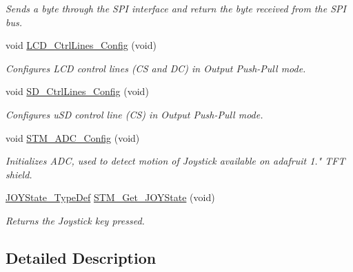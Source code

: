 \begin{DoxyCompactItemize}
\begin{DoxyCompactList}\small\item\em Sends a byte through the S\+PI interface and return the byte received from the S\+PI bus. \end{DoxyCompactList}\item 
void \mbox{\hyperlink{group___s_t_m32_f1_x_x___n_u_c_l_e_o___l_o_w___l_e_v_e_l___exported___functions_ga97c5f806cbaa70bc21a31c96ce30c700}{L\+C\+D\+\_\+\+Ctrl\+Lines\+\_\+\+Config}} (void)
\begin{DoxyCompactList}\small\item\em Configures L\+CD control lines (CS and DC) in Output Push-\/\+Pull mode. \end{DoxyCompactList}\item 
void \mbox{\hyperlink{group___s_t_m32_f1_x_x___n_u_c_l_e_o___l_o_w___l_e_v_e_l___exported___functions_gab74f2e2b8a8574b00ea67be7fda66e1d}{S\+D\+\_\+\+Ctrl\+Lines\+\_\+\+Config}} (void)
\begin{DoxyCompactList}\small\item\em Configures u\+SD control line (CS) in Output Push-\/\+Pull mode. \end{DoxyCompactList}\item 
void \mbox{\hyperlink{group___s_t_m32_f1_x_x___n_u_c_l_e_o___l_o_w___l_e_v_e_l___exported___functions_ga7490dd52f52a50afa37e2ed329d5c82a}{S\+T\+M\+\_\+\+A\+D\+C\+\_\+\+Config}} (void)
\begin{DoxyCompactList}\small\item\em Initializes A\+DC, used to detect motion of Joystick available on adafruit 1." T\+FT shield. \end{DoxyCompactList}\item 
\mbox{\hyperlink{group___s_t_m32_f1_x_x___n_u_c_l_e_o___l_o_w___l_e_v_e_l___exported___types_ga7466d9ae142b713772373c9ddfc90332}{J\+O\+Y\+State\+\_\+\+Type\+Def}} \mbox{\hyperlink{group___s_t_m32_f1_x_x___n_u_c_l_e_o___l_o_w___l_e_v_e_l___exported___functions_gab68de4912bc80f43614605cd410a0b4d}{S\+T\+M\+\_\+\+Get\+\_\+\+J\+O\+Y\+State}} (void)
\begin{DoxyCompactList}\small\item\em Returns the Joystick key pressed. \end{DoxyCompactList}\end{DoxyCompactItemize}


\subsection{Detailed Description}


